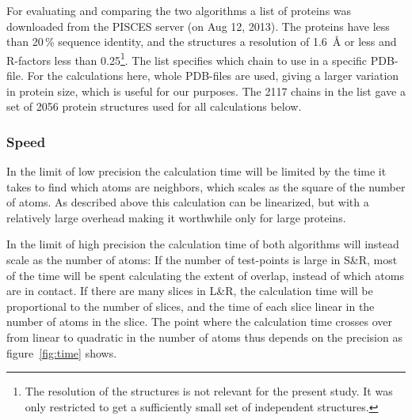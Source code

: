 \documentclass[a4paper,11pt]{article}
\begin{document}
For evaluating and comparing the two algorithms a list of proteins was
downloaded from the PISCES server (on Aug 12, 2013). The proteins have
less than 20\,\% sequence identity, and the structures a resolution of
1.6~Å or less and R-factors less than 0.25\footnote{The resolution of
  the structures is not relevant for the present study. It was only
  restricted to get a sufficiently small set of independent
  structures.}. The list specifies which chain to use in a specific
PDB-file. For the calculations here, whole PDB-files are used, giving
a larger variation in protein size, which is useful for our
purposes. The 2117 chains in the list gave a set of 2056 protein
structures used for all calculations below.

\subsubsection{Speed}\label{sec:speed}

In the limit of low precision the calculation time will be limited by
the time it takes to find which atoms are neighbors, which scales as
the square of the number of atoms. As described above this calculation
can be linearized, but with a relatively large overhead making it
worthwhile only for large proteins.

In the limit of high precision the calculation time of both algorithms
will instead scale as the number of atoms: If the number of
test-points is large in S\&R, most of the time will be spent
calculating the extent of overlap, instead of which atoms are in
contact. If there are many slices in L\&R, the calculation time will
be proportional to the number of slices, and the time of each slice
linear in the number of atoms in the slice.  The point where the
calculation time crosses over from linear to quadratic in the number
of atoms thus depends on the precision as figure~\ref{fig:time} shows.
\end{document}
